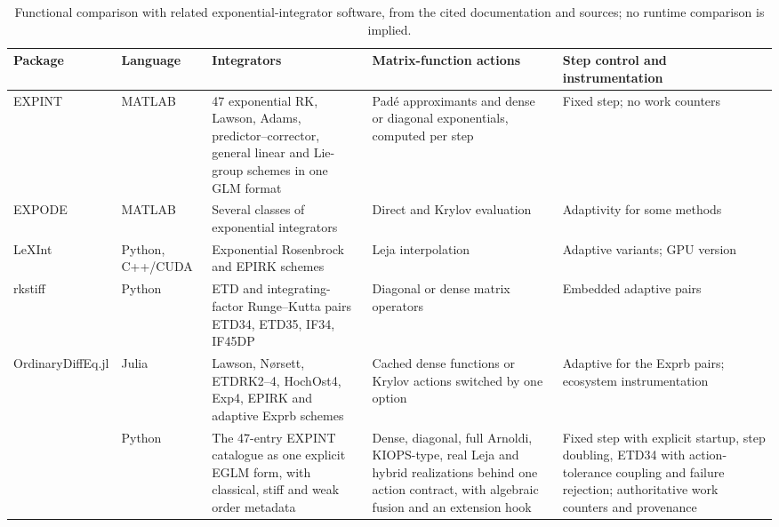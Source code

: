\begin{table}[t]
\centering\small
\caption{Functional comparison with related exponential-integrator software, from the cited documentation and sources; no runtime comparison is implied.}\label{tab:comparison}
\begin{tabularx}{\linewidth}{@{}p{2.75cm}p{1.45cm}X X X@{}}\toprule
Package & Language & Integrators & Matrix-function actions & Step control and instrumentation\\\midrule
EXPINT~\cite{BerlandSkaflestadWright2007} & MATLAB & 47 exponential RK, Lawson, Adams, predictor--corrector, general linear and Lie-group schemes in one GLM format & Pad\'e approximants and dense or diagonal exponentials, computed per step & Fixed step; no work counters\\\addlinespace
EXPODE~\cite{Jansing2014} & MATLAB & Several classes of exponential integrators & Direct and Krylov evaluation & Adaptivity for some methods\\\addlinespace
LeXInt~\cite{DekaEinkemmerTokman2023,DekaMorigglEinkemmer2023} & Python, C++/CUDA & Exponential Rosenbrock and EPIRK schemes & Leja interpolation & Adaptive variants; GPU version\\\addlinespace
rkstiff~\cite{rkstiff} & Python & ETD and integrating-factor Runge--Kutta pairs ETD34, ETD35, IF34, IF45DP & Diagonal or dense matrix operators & Embedded adaptive pairs\\\addlinespace
OrdinaryDiffEq.jl \cite{OrdinaryDiffEqExponential} & Julia & Lawson, N{\o}rsett, ETDRK2--4, HochOst4, Exp4, EPIRK and adaptive Exprb schemes & Cached dense functions or Krylov actions switched by one option & Adaptive for the Exprb pairs; ecosystem instrumentation\\\addlinespace
\pkg{} & Python & The 47-entry EXPINT catalogue as one explicit EGLM form, with classical, stiff and weak order metadata & Dense, diagonal, full Arnoldi, KIOPS-type, real Leja and hybrid realizations behind one action contract, with algebraic fusion and an extension hook & Fixed step with explicit startup, step doubling, ETD34 with action-tolerance coupling and failure rejection; authoritative work counters and provenance\\\bottomrule
\end{tabularx}
\end{table}
